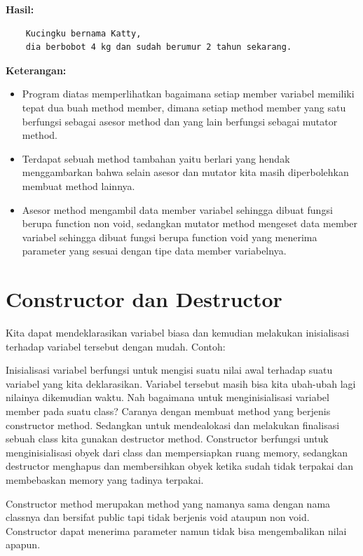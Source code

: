 \textbf{Hasil:}
\begin{lstlisting}
	Kucingku bernama Katty,
	dia berbobot 4 kg dan sudah berumur 2 tahun sekarang.
\end{lstlisting}


\textbf{Keterangan:}

\begin{itemize}

\item
 Program diatas memperlihatkan bagaimana setiap member variabel
 memiliki tepat dua buah method member, dimana setiap method member
 yang satu berfungsi sebagai asesor method dan yang lain berfungsi
 sebagai mutator method.
\item
 Terdapat sebuah method tambahan yaitu berlari yang hendak
 menggambarkan bahwa selain asesor dan mutator kita masih diperbolehkan
 membuat method lainnya.
\item
 Asesor method mengambil data member variabel sehingga dibuat fungsi
 berupa function non void, sedangkan mutator method mengeset data
 member variabel sehingga dibuat fungsi berupa function void yang
 menerima parameter yang sesuai dengan tipe data member variabelnya.
\end{itemize}

\section{Constructor dan
Destructor}\label{constructor-dan-destructor}

Kita dapat mendeklarasikan variabel biasa dan kemudian melakukan
inisialisasi terhadap variabel tersebut dengan mudah. Contoh:



Inisialisasi variabel berfungsi untuk mengisi suatu nilai awal terhadap
suatu variabel yang kita deklarasikan. Variabel tersebut masih bisa kita
ubah-ubah lagi nilainya dikemudian waktu. Nah bagaimana untuk
menginisialisasi variabel member pada suatu class? Caranya dengan
membuat method yang berjenis constructor method. Sedangkan untuk
mendealokasi dan melakukan finalisasi sebuah class kita gunakan
destructor method. Constructor berfungsi untuk menginisialisasi obyek
dari class dan mempersiapkan ruang memory, sedangkan destructor
menghapus dan membersihkan obyek ketika sudah tidak terpakai dan
membebaskan memory yang tadinya terpakai.

Constructor method merupakan method yang namanya sama dengan nama
classnya dan bersifat public tapi tidak berjenis void ataupun non void.
Constructor dapat menerima parameter namun tidak bisa mengembalikan
nilai apapun.

